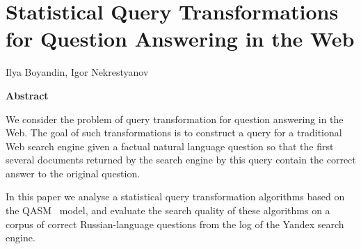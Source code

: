 \documentclass{article}
\begin{document}



\bigskip

\section*{\center Statistical Query Transformations for Question Answering in the Web}

\begin{center}
Ilya Boyandin, Igor Nekrestyanov

\bigskip

{\bf Abstract}
\end{center}

We consider the problem of query transformation for question answering in
the Web. The goal of such transformations is
to construct a query for a traditional Web search engine
given a factual natural language question
so that the first several documents returned by the search engine by this query
contain the correct answer to the original question.

In this paper we analyse a statistical query transformation algorithms based
on the QASM~\cite{qa:radev:qasm} model, and evaluate the search quality of
these algorithms on a corpus of correct Russian-language questions
from the log of the Yandex search engine.
\end{document}
